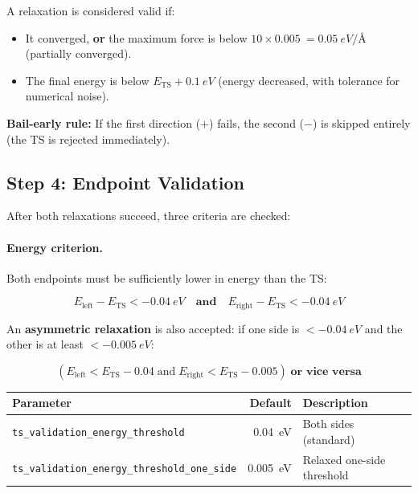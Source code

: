 \documentclass[11pt,a4paper]{article}
\begin{document}
\noindent A relaxation is considered valid if:
\begin{itemize}
    \item It converged, \textbf{or} the maximum force is below $10 \times \SI{0.005}{} = \SI{0.05}{eV/\angstrom}$ (partially converged).
    \item The final energy is below $E_\text{TS} + \SI{0.1}{eV}$ (energy decreased, with tolerance for numerical noise).
\end{itemize}

\textbf{Bail-early rule:} If the first direction ($+$) fails, the second ($-$) is skipped entirely (the TS is rejected immediately).

\subsection{Step 4: Endpoint Validation}

After both relaxations succeed, three criteria are checked:

\paragraph{Energy criterion.} Both endpoints must be sufficiently lower in energy than the TS:

\begin{equation}
    E_\text{left} - E_\text{TS} < -\SI{0.04}{eV} \quad \textbf{and} \quad E_\text{right} - E_\text{TS} < -\SI{0.04}{eV}
\end{equation}

An \textbf{asymmetric relaxation} is also accepted: if one side is $< -\SI{0.04}{eV}$ and the other is at least $< -\SI{0.005}{eV}$:

\begin{equation}
    \left(E_\text{left} < E_\text{TS} - 0.04 \;\text{and}\; E_\text{right} < E_\text{TS} - 0.005\right) \;\textbf{or vice versa}
\end{equation}

\begin{threshbox}
\begin{tabular}{lrl}
\toprule
Parameter & Default & Description \\
\midrule
\texttt{ts\_validation\_energy\_threshold} & \SI{0.04}{eV} & Both sides (standard) \\
\texttt{ts\_validation\_energy\_threshold\_one\_side} & \SI{0.005}{eV} & Relaxed one-side threshold \\
\bottomrule
\end{tabular}
\end{threshbox}
\end{document}
